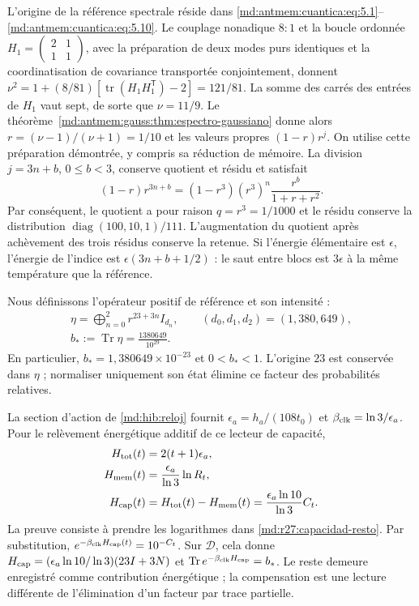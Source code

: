 L'origine de la référence spectrale réside dans \eqref{md:antmem:cuantica:eq:5.1}--\eqref{md:antmem:cuantica:eq:5.10}. Le couplage nonadique $8:1$ et la boucle ordonnée
$H_1=\left(\begin{smallmatrix}2&1\\1&1\end{smallmatrix}\right)$, avec la préparation de deux modes purs identiques et la coordinatisation de covariance transportée conjointement, donnent $\nu^2=1+(8/81)[\operatorname{tr}(H_1H_1^{\mathsf T})-2]=121/81$. La somme des carrés des entrées de $H_1$ vaut sept, de sorte que $\nu=11/9$. Le théorème~\ref{md:antmem:gauss:thm:espectro-gaussiano} donne alors $r=(\nu-1)/(\nu+1)=1/10$ et les valeurs propres $(1-r)r^j$. On utilise cette préparation démontrée, y compris sa réduction de mémoire. La division $j=3n+b$, $0\le b<3$, conserve quotient et résidu et satisfait
\begin{equation}
 (1-r)r^{3n+b}=(1-r^3)(r^3)^n\frac{r^b}{1+r+r^2}.
 \label{md:r27:factorizacion}
\end{equation}
Par conséquent, le quotient a pour raison $q=r^3=1/1000$ et le résidu conserve la distribution $\operatorname{diag}(100,10,1)/111$. L'augmentation du quotient après achèvement des trois résidus conserve la retenue. Si l'énergie élémentaire est $\epsilon$, l'énergie de l'indice est $\epsilon(3n+b+1/2)$ : le saut entre blocs est $3\epsilon$ à la même température que la référence.

Nous définissons l'opérateur positif de référence et son intensité :
\begin{equation}
 \begin{gathered}
 \eta=\bigoplus_{n=0}^{2}r^{23+3n}I_{d_n},\qquad
 (d_0,d_1,d_2)=(1,380,649),\\
 b_*:=\operatorname{Tr}\eta=\frac{1380649}{10^{29}}.
 \end{gathered}
 \label{md:r27:eta}
\end{equation}
En particulier, $b_*=1{,}380649\times10^{-23}$ et $0<b_*<1$. L'origine $23$ est conservée dans $\eta$ ; normaliser uniquement son état élimine ce facteur des probabilités relatives.

La section d'action de \eqref{md:hib:reloj} fournit $\epsilon_a=h_a/(108t_0)$ et $\beta_{\rm clk}=\ln3/\epsilon_a$. Pour le relèvement énergétique additif de ce lecteur de capacité,
\begin{equation}
 \begin{split}
 H_{\rm tot}(t)&=2(t+1)\epsilon_a,\\
 H_{\rm mem}(t)&=\frac{\epsilon_a}{\ln3}\ln R_t,\\
 H_{\rm cap}(t)&=H_{\rm tot}(t)-H_{\rm mem}(t)
 =\frac{\epsilon_a\ln10}{\ln3}C_t.
 \end{split}
 \label{md:r27:energia-capacidad}
\end{equation}
La preuve consiste à prendre les logarithmes dans \eqref{md:r27:capacidad-resto}. Par substitution, $e^{-\beta_{\rm clk}H_{\rm cap}(t)}=10^{-C_t}$. Sur $\mathcal D$, cela donne $H_{\rm cap}=(\epsilon_a\ln10/\ln3)(23I+3N)$ et $\operatorname{Tr}e^{-\beta_{\rm clk}H_{\rm cap}}=b_*$. Le reste demeure enregistré comme contribution énergétique ; la compensation est une lecture différente de l'élimination d'un facteur par trace partielle.

